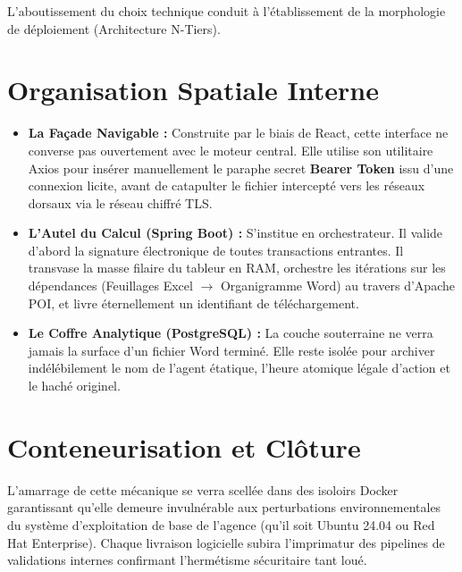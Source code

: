 \documentclass[12pt,a4paper,oneside]{report}
\begin{document}
L'aboutissement du choix technique conduit à l'établissement de la morphologie de déploiement (Architecture N-Tiers). 

\section{Organisation Spatiale Interne}

\begin{itemize}
    \item \textbf{La Façade Navigable :} Construite par le biais de React, cette interface ne converse pas ouvertement avec le moteur central. Elle utilise son utilitaire Axios pour insérer manuellement le paraphe secret \textbf{Bearer Token} issu d'une connexion licite, avant de catapulter le fichier intercepté vers les réseaux dorsaux via le réseau chiffré TLS.
    \item \textbf{L'Autel du Calcul (Spring Boot) :} S'institue en orchestrateur. Il valide d'abord la signature électronique de toutes transactions entrantes. Il transvase la masse filaire du tableur en RAM, orchestre les itérations sur les dépendances (Feuillages Excel $\rightarrow$ Organigramme Word) au travers d'Apache POI, et livre éternellement un identifiant de téléchargement.
    \item \textbf{Le Coffre Analytique (PostgreSQL) :} La couche souterraine ne verra jamais la surface d'un fichier Word terminé. Elle reste isolée pour archiver indélébilement le nom de l'agent étatique, l'heure atomique légale d'action et le haché originel. 
\end{itemize}

\section{Conteneurisation et Clôture}
L'amarrage de cette mécanique se verra scellée dans des isoloirs Docker garantissant qu'elle demeure invulnérable aux perturbations environnementales du système d'exploitation de base de l'agence (qu'il soit Ubuntu 24.04 ou Red Hat Enterprise). Chaque livraison logicielle subira l'imprimatur des pipelines de validations internes confirmant l'hermétisme sécuritaire tant loué.
\end{document}
